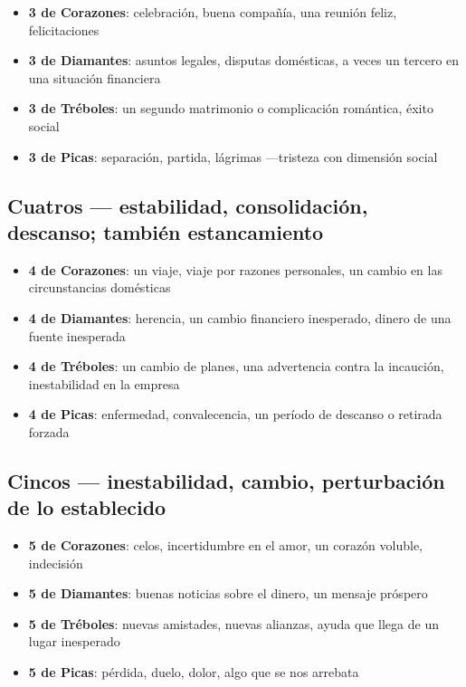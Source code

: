 \begin{itemize}
\tightlist
\item
  \textbf{3 de Corazones}: celebración, buena compañía, una reunión feliz, felicitaciones
\item
  \textbf{3 de Diamantes}: asuntos legales, disputas domésticas, a veces un tercero en una situación financiera
\item
  \textbf{3 de Tréboles}: un segundo matrimonio o complicación romántica, éxito social
\item
  \textbf{3 de Picas}: separación, partida, lágrimas ---tristeza con dimensión social
\end{itemize}

\subsection{Cuatros --- estabilidad, consolidación, descanso; también estancamiento}\label{fours--stability-consolidation-rest-also-stagnation}

\begin{itemize}
\tightlist
\item
  \textbf{4 de Corazones}: un viaje, viaje por razones personales, un cambio en las circunstancias domésticas
\item
  \textbf{4 de Diamantes}: herencia, un cambio financiero inesperado, dinero de una fuente inesperada
\item
  \textbf{4 de Tréboles}: un cambio de planes, una advertencia contra la incaución, inestabilidad en la empresa
\item
  \textbf{4 de Picas}: enfermedad, convalecencia, un período de descanso o retirada forzada
\end{itemize}

\subsection{Cincos --- inestabilidad, cambio, perturbación de lo establecido}\label{fives--instability-change-disruption-of-what-was-established}

\begin{itemize}
\tightlist
\item
  \textbf{5 de Corazones}: celos, incertidumbre en el amor, un corazón voluble, indecisión
\item
  \textbf{5 de Diamantes}: buenas noticias sobre el dinero, un mensaje próspero
\item
  \textbf{5 de Tréboles}: nuevas amistades, nuevas alianzas, ayuda que llega de un lugar inesperado
\item
  \textbf{5 de Picas}: pérdida, duelo, dolor, algo que se nos arrebata
\end{itemize}

